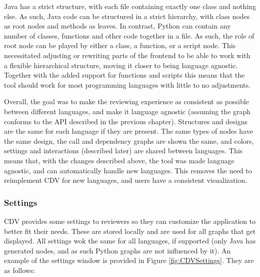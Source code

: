 \documentclass[a4paper,11pt,twoside]{article}
\theoremstyle{definition} %
\begin{document}
Java has a strict structure, with each file containing exactly one class and nothing else. As such, Java code can be structured in a strict hierarchy, with class nodes as root nodes and methods as leaves. In contrast, Python can contain any number of classes, functions and other code together in a file. As such, the role of root node can be played by either a class, a function, or a script node. This necessitated adjusting or rewriting parts of the frontend to be able to work with a flexible hierarchical structure, moving it closer to being language agnostic. Together with the added support for functions and scripts this means that the tool should work for most programming languages with little to no adjustments. 

Overall, the goal was to make the reviewing experience as consistent as possible between different languages, and make it language agnostic (assuming the graph conforms to the API described in the previous chapter). Structures and designs are the same for each language if they are present. The same types of nodes have the same design, the call and dependency graphs are shown the same, and colors, settings and interactions (described later) are shared between languages. This means that, with the changes described above, the tool was made language agnostic, and can automatically handle new languages. This removes the need to reimplement CDV for new languages, and users have a consistent visualization.


\subsubsection{Settings} \label{SubSubSec:FrontendSettings}
CDV provides some settings to reviewers so they can customize the application to better fit their needs. These are stored locally and are used for all graphs that get displayed. All settings wok the same for all languages, if supported (only Java has generated nodes, and as such Python graphs are not influenced by it). An example of the settings window is provided in Figure \ref{fig:CDVSettings}. They are as follows:
\end{document}
